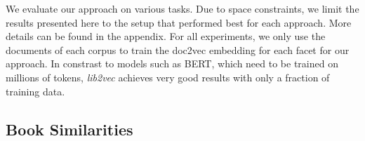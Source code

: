 \documentclass[11pt]{article}
\begin{document}
We evaluate our approach on various tasks.
Due to space constraints, we limit the results presented here to the setup that performed best for each approach.
More details can be found in the appendix.
For all experiments, we only use the documents of each corpus to train the doc2vec embedding for each facet for our approach.
In constrast to models such as BERT, which need to be trained on millions of tokens, \emph{lib2vec} achieves very good results with only a fraction of training data.

\subsection{Book Similarities}
\end{document}

